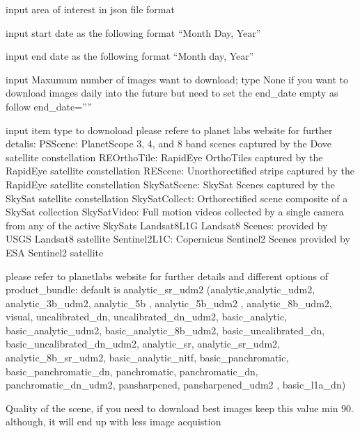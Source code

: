\documentclass[letterpaper,10pt,english]{sphinxmanual}
\begin{document}
\begin{fulllineitems}
\begin{description}
\sphinxAtStartPar
input area of interest in json file format

\sphinxAtStartPar
input start date as the following format “Month Day, Year”

\sphinxAtStartPar
input end date as the following format “Month day, Year”

\sphinxAtStartPar
input Maxumum number of images want to download; type None if you want to download images daily into the future but need to set the end\_date empty as follow end\_date=””

\sphinxAtStartPar
input item type to downoload please refere to planet labs website for further detalis: 
PSScene:    PlanetScope 3, 4, and 8 band scenes captured by the Dove satellite constellation
REOrthoTile:        RapidEye OrthoTiles captured by the RapidEye satellite constellation
REScene:    Unorthorectified strips captured by the RapidEye satellite constellation
SkySatScene:        SkySat Scenes captured by the SkySat satellite constellation
SkySatCollect:      Orthorectified scene composite of a SkySat collection
SkySatVideo:        Full motion videos collected by a single camera from any of the active SkySats
Landsat8L1G Landsat8 Scenes: provided by USGS Landsat8 satellite
Sentinel2L1C:       Copernicus Sentinel\sphinxhyphen{}2 Scenes provided by ESA Sentinel\sphinxhyphen{}2 satellite

\sphinxAtStartPar
please refer to planetlabs website for further details and different options of product\_bundle: default is analytic\_sr\_udm2
(analytic,analytic\_udm2, analytic\_3b\_udm2, analytic\_5b , analytic\_5b\_udm2 , analytic\_8b\_udm2, visual, uncalibrated\_dn, 
uncalibrated\_dn\_udm2, basic\_analytic, basic\_analytic\_udm2, basic\_analytic\_8b\_udm2, basic\_uncalibrated\_dn,
basic\_uncalibrated\_dn\_udm2, analytic\_sr, analytic\_sr\_udm2, analytic\_8b\_sr\_udm2, basic\_analytic\_nitf, 
basic\_panchromatic, basic\_panchromatic\_dn, panchromatic, panchromatic\_dn, panchromatic\_dn\_udm2,
pansharpened, pansharpened\_udm2 , basic\_l1a\_dn)

\sphinxAtStartPar
Quality of the scene, if you need to download best images keep this value min 90. although, it will end up with less image acquistion


\end{description}
\end{fulllineitems}
\end{document}
